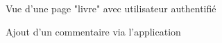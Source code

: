 \documentclass[a4paper, 12pt]{article}
\begin{document}
\begin{figure}
    \begin{center}
    \end{center}
    \caption{Vue d'une page "livre" avec utilisateur authentifié}
\end{figure}
\begin{figure}
    \begin{center}
    \end{center}
    \caption{Ajout d'un commentaire via l'application}
\end{figure}
\end{document}
